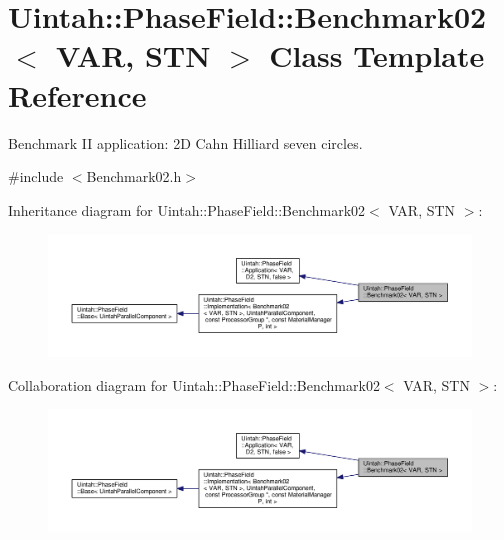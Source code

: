 \hypertarget{classUintah_1_1PhaseField_1_1Benchmark02}{}\section{Uintah\+:\+:Phase\+Field\+:\+:Benchmark02$<$ V\+AR, S\+TN $>$ Class Template Reference}
\label{classUintah_1_1PhaseField_1_1Benchmark02}


Benchmark II application\+: 2D Cahn Hilliard seven circles.  




{\ttfamily \#include $<$Benchmark02.\+h$>$}



Inheritance diagram for Uintah\+:\+:Phase\+Field\+:\+:Benchmark02$<$ V\+AR, S\+TN $>$\+:\nopagebreak
\begin{figure}[H]
\begin{center}
\leavevmode
\includegraphics[width=350pt]{classUintah_1_1PhaseField_1_1Benchmark02__inherit__graph}
\end{center}
\end{figure}


Collaboration diagram for Uintah\+:\+:Phase\+Field\+:\+:Benchmark02$<$ V\+AR, S\+TN $>$\+:\nopagebreak
\begin{figure}[H]
\begin{center}
\leavevmode
\includegraphics[width=350pt]{classUintah_1_1PhaseField_1_1Benchmark02__coll__graph}
\end{center}
\end{figure}
